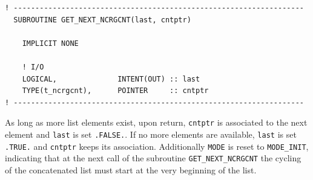 \documentclass[11pt,twoside]{report}
\begin{document}
\begin{verbatim}
! -------------------------------------------------------------------
  SUBROUTINE GET_NEXT_NCRGCNT(last, cntptr)

    IMPLICIT NONE

    ! I/O
    LOGICAL,              INTENT(OUT) :: last
    TYPE(t_ncrgcnt),      POINTER     :: cntptr
! -------------------------------------------------------------------
\end{verbatim}
As long as more list elements exist, upon return, \verb|cntptr| is
associated to  
the next element and \verb|last| is set \verb|.FALSE.|. If no more elements
are available, \verb|last| is set \verb|.TRUE.| and \verb|cntptr| keeps its
association. Additionally \verb|MODE| is reset to \verb|MODE_INIT|,
indicating that at the next call of the
subroutine \verb|GET_NEXT_NCRGCNT| the cycling of  
the concatenated list must start at the very beginning of the list.
\end{document}
